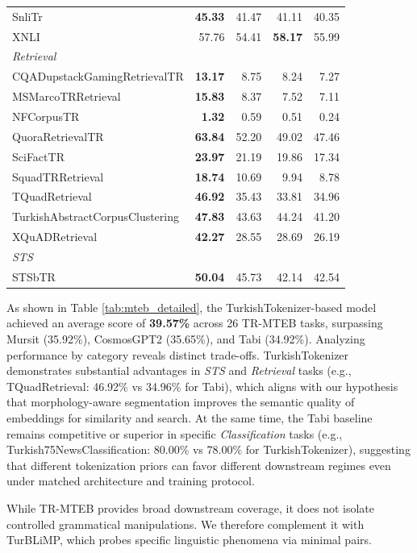 \begin{table}[H]
{\begin{tabular}{lrrrr}
SnliTr & \textbf{45.33} & 41.47 & 41.11 & 40.35 \\
XNLI & 57.76 & 54.41 & \textbf{58.17} & 55.99 \\
\multicolumn{5}{l}{\textit{Retrieval}} \\
CQADupstackGamingRetrievalTR & \textbf{13.17} & 8.75 & 8.24 & 7.27 \\
MSMarcoTRRetrieval & \textbf{15.83} & 8.37 & 7.52 & 7.11 \\
NFCorpusTR & \textbf{1.32} & 0.59 & 0.51 & 0.24 \\
QuoraRetrievalTR & \textbf{63.84} & 52.20 & 49.02 & 47.46 \\
SciFactTR & \textbf{23.97} & 21.19 & 19.86 & 17.34 \\
SquadTRRetrieval & \textbf{18.74} & 10.69 & 9.94 & 8.78 \\
TQuadRetrieval & \textbf{46.92} & 35.43 & 33.81 & 34.96 \\
TurkishAbstractCorpusClustering & \textbf{47.83} & 43.63 & 44.24 & 41.20 \\
XQuADRetrieval & \textbf{42.27} & 28.55 & 28.69 & 26.19 \\
\multicolumn{5}{l}{\textit{STS}} \\
STSbTR & \textbf{50.04} & 45.73 & 42.14 & 42.54 \\
\bottomrule
\end{tabular}
}
\end{table}

As shown in Table \ref{tab:mteb_detailed}, the TurkishTokenizer-based model achieved an average score of \textbf{39.57\%} across 26 TR-MTEB tasks, surpassing Mursit (35.92\%), CosmosGPT2 (35.65\%), and Tabi (34.92\%). Analyzing performance by category reveals distinct trade-offs. TurkishTokenizer demonstrates substantial advantages in \textit{STS} and \textit{Retrieval} tasks (e.g., TQuadRetrieval: 46.92\% vs 34.96\% for Tabi), which aligns with our hypothesis that morphology-aware segmentation improves the semantic quality of embeddings for similarity and search. At the same time, the Tabi baseline remains competitive or superior in specific \textit{Classification} tasks (e.g., Turkish75NewsClassification: 80.00\% vs 78.00\% for TurkishTokenizer), suggesting that different tokenization priors can favor different downstream regimes even under matched architecture and training protocol.

While TR-MTEB provides broad downstream coverage, it does not isolate controlled grammatical manipulations. We therefore complement it with TurBLiMP, which probes specific linguistic phenomena via minimal pairs.


